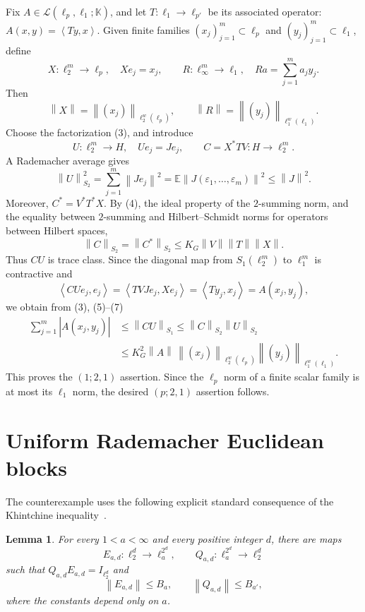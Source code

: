\documentclass[11pt]{article}
\newtheorem{lemma}{Lemma}
\newcommand{\K}{\mathbb K}
\newcommand{\Lcal}{\mathcal L}
\newcommand{\norm}[1]{\left\lVert #1\right\rVert}
\newcommand{\ip}[2]{\left\langle #1,#2\right\rangle}
\begin{document}
Fix $A\in\Lcal(\ell_p,\ell_1;\K)$, and let
$T:\ell_1\to\ell_{p'}$ be its associated operator:
$A(x,y)=\ip{Ty}{x}$.  Given finite families $(x_j)_{j=1}^m\subset\ell_p$ and
$(y_j)_{j=1}^m\subset\ell_1$, define
\[
 X:\ell_2^m\to\ell_p,\quad Xe_j=x_j,
 \qquad
 R:\ell_\infty^m\to\ell_1,\quad Ra=\sum_{j=1}^m a_jy_j.
\]
Then
\[
 \norm X=\norm{(x_j)}_{\ell_2^w(\ell_p)},\qquad
 \norm R=\norm{(y_j)}_{\ell_1^w(\ell_1)}.                              \tag{5}
\]
Choose the factorization (3), and introduce
\[
 U:\ell_2^m\to H,\quad Ue_j=Je_j,
 \qquad C=X^*TV:H\to\ell_2^m.
\]
A Rademacher average gives
\[
 \norm U_{S_2}^2
 =\sum_{j=1}^m\norm{Je_j}^2
 =\mathbb E\norm{J(\varepsilon_1,\ldots,\varepsilon_m)}^2
 \le\norm J^2.                                                         \tag{6}
\]
Moreover, $C^*=V^*T^*X$.  By (4), the ideal property of the $2$-summing norm,
and the equality between $2$-summing and Hilbert--Schmidt norms for operators
between Hilbert spaces,
\[
 \norm C_{S_2}=\norm{C^*}_{S_2}
 \le K_G\norm V\norm T\norm X.                                        \tag{7}
\]
Thus $CU$ is trace class.  Since the diagonal map from $S_1(\ell_2^m)$ to
$\ell_1^m$ is contractive and
\[
 \ip{CUe_j}{e_j}
 =\ip{TVJe_j}{Xe_j}
 =\ip{Ty_j}{x_j}=A(x_j,y_j),
\]
we obtain from (3), (5)--(7)
\begin{align*}
 \sum_{j=1}^m|A(x_j,y_j)|
 &\le\norm{CU}_{S_1}
 \le\norm C_{S_2}\norm U_{S_2}\\
 &\le K_G^2\norm A\,
 \norm{(x_j)}_{\ell_2^w(\ell_p)}
 \norm{(y_j)}_{\ell_1^w(\ell_1)}.                                    \tag{8}
\end{align*}
This proves the $(1;2,1)$ assertion.  Since the $\ell_p$ norm of a finite
scalar family is at most its $\ell_1$ norm, the desired $(p;2,1)$ assertion
follows.

\section{Uniform Rademacher Euclidean blocks}

The counterexample uses the following explicit standard consequence of the
Khintchine inequality~\cite{Haagerup}.

\begin{lemma}\label{lem:blocks}
For every $1<a<\infty$ and every positive integer $d$, there are maps
\[
 E_{a,d}:\ell_2^d\to\ell_a^{2^d},\qquad
 Q_{a,d}:\ell_a^{2^d}\to\ell_2^d
\]
such that $Q_{a,d}E_{a,d}=I_{\ell_2^d}$ and
\[
 \norm{E_{a,d}}\le B_a,\qquad \norm{Q_{a,d}}\le B_{a'},                \tag{9}
\]
where the constants depend only on $a$.
\end{lemma}
\end{document}
